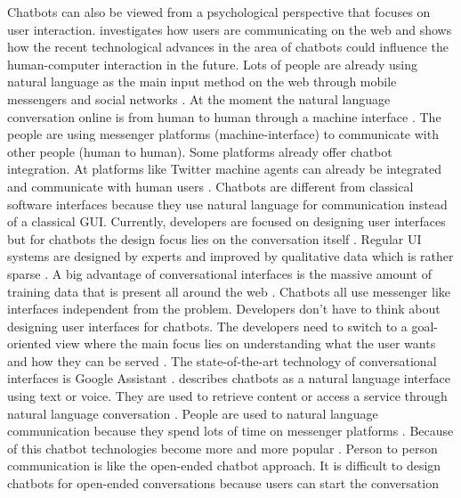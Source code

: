 Chatbots can also be viewed from a psychological perspective that focuses on user interaction.
\citet{folstad2017chatbots} investigates how users are communicating on the web and shows how 
the recent technological advances in the area of chatbots could influence the human-computer interaction in the future.
Lots of people are already using natural language as the main input method on the web through mobile messengers 
and social networks \cite{folstad2017chatbots}. 
At the moment the natural language conversation online is from human to human through a machine interface \cite{folstad2017chatbots}.
The people are using messenger platforms (machine-interface) to communicate with other people (human to human).
Some platforms already offer chatbot integration. 
At platforms like Twitter machine agents can already be integrated and communicate with human users \cite{folstad2017chatbots}. 
Chatbots are different from classical software interfaces because they use natural language 
for communication instead of a classical GUI.
Currently, developers are focused on designing user interfaces but for chatbots the design focus 
lies on the conversation itself \cite{folstad2017chatbots}. 
Regular UI systems are designed by experts and improved by qualitative data which is rather sparse \cite{folstad2017chatbots}.
A big advantage of conversational interfaces is the massive amount of training data that is present all around the web \cite{folstad2017chatbots}. 
Chatbots all use messenger like interfaces independent from the problem.
Developers don't have to think about designing user interfaces for chatbots.
The developers need to switch to a goal-oriented view where the main focus 
lies on understanding what the user wants and how they can be served \cite{folstad2017chatbots}.
The state-of-the-art technology of conversational interfaces is Google Assistant \cite{folstad2017chatbots}.
\citet{brandtzaeg2018chatbots} describes chatbots as a natural language interface using text or voice.
They are used to retrieve content or access a service through natural language conversation \cite{brandtzaeg2018chatbots}.
People are used to natural language communication because they spend lots of time on messenger platforms \cite{brandtzaeg2018chatbots}.
Because of this chatbot technologies become more and more popular \cite{brandtzaeg2018chatbots}.
Person to person communication is like the open-ended chatbot approach.
It is difficult to design chatbots for open-ended conversations because users can start the conversation
